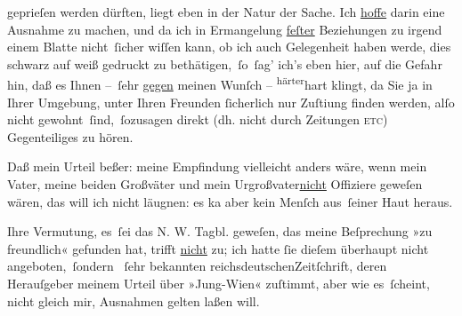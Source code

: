                geprieſen werden dürften, liegt eben in der Natur der Sache. Ich \uline{hoffe} darin eine Ausnahme zu machen, und da ich in Ermangelung \uline{feſter} Beziehungen zu irgend einem Blatte nicht ſicher
               wiſſen kann, ob ich auch Gelegenheit haben werde, dies schwarz auf weiß gedruckt zu
               bethätigen, ſo ſag’ ich’s eben hier, auf die Gefahr hin, daß es Ihnen – ſehr \uline{gegen} meinen Wunſch – \substVorne{}\textsuperscript{härter}\substDazwischen{}hart\substHinten{} klingt, da Sie ja in Ihrer Umgebung, unter Ihren Freunden{ }ſicherlich nur
                  Zuſti{\geminationm}ung finden werden, alſo nicht
               gewohnt ſind, ſozusagen direkt  (dh. nicht durch
               Zeitungen \textsc{etc}) Gegenteiliges zu hören.\pend
           
\pstart
           Daß mein Urteil  beßer: meine Em{\pb}pfindung vielleicht anders wäre, wenn  mein Vater, meine beiden Großväter und
               mein Urgroßvater\uline{nicht} Offiziere geweſen wären, das will ich nicht
               läugnen: es ka{\geminationn} aber kein Menſch aus ſeiner Haut
               heraus.\pend
           
\pstart
           Ihre Vermutung, es ſei das N. W. Tagbl. geweſen,
               das meine Beſprechung »zu
               freundlich« gefunden hat, trifft \uline{nicht} zu; ich hatte
                  ſie dieſem überhaupt nicht angeboten, ſondern
                  \label{T_L04231-1v}\label{T_L04231-1} ſehr bekannten
                  reichsdeutschenZeitſchrift, deren Herauſgeber meinem Urteil
               über »Jung-Wien« zuſtimmt, aber wie es ſcheint,
               nicht gleich mir, Ausnahmen gelten laßen will.\pend
           

